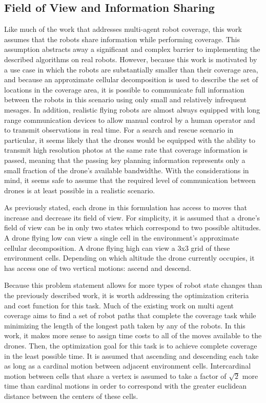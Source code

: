 \subsection{Field of View and Information Sharing}

Like much of the work that addresses multi-agent robot coverage, this work assumes that the robots share information while performing coverage. This assumption abstracts away a significant and complex barrier to implementing the described algorithms on real robots. However, because this work is motivated by a use case in which the robots are substantially smaller than their coverage area, and because an approximate cellular decomposition is used to describe the set of locations in the coverage area, it is possible to communicate full information between the robots in this scenario using only small and relatively infrequent mesages. In addition, realistic flying robots are almost always equipped with long range communication devices to allow manual control by a human operator and to transmit observations in real time. For a search and rescue scenario in particular, it seems likely that the drones would be equipped with the ability to transmit high resolution photos at the same rate that coverage information is passed, meaning that the passing key planning information represents only a small fraction of the drone's available bandwidthe. With the considerations in mind, it seems safe to assume that the required level of communication between drones is at least possible in a realistic scenario. 

As previously stated, each drone in this formulation has access to moves that increase and decrease its field of view. For simplicity, it is assumed that a drone's field of view can be in only two states which correspond to two possible altitudes. A drone flying low can view a single cell in the environment's approximate cellular decomposition. A drone flying high can view a 3x3 grid of these environment cells. Depending on which altitude the drone currently occupies, it has access one of two vertical motions: ascend and descend.

Because this problem statement allows for more types of robot state changes than the previously described work, it is worth addressing the optimization criteria and cost function for this task. Much of the existing work on multi agent coverage aims to find a set of robot paths that complete the coverage task while minimizing the length of the longest path taken by any of the robots. In this work, it makes more sense to assign time costs to all of the moves available to the drones. Then, the optimization goal for this task is to achieve complete coverage in the least possible time. It is assumed that ascending and descending each take as long as a cardinal motion between adjacent environment cells. Intercardinal motion between cells that share a vertex is assumed to take a factor of $ \sqrt{2} $ more time than cardinal motions in order to correspond with the greater euclidean distance between the centers of these cells.

